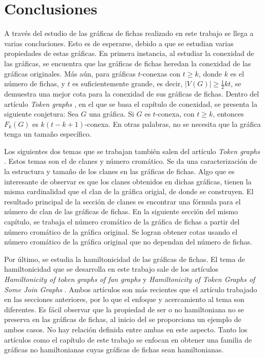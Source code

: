 \chapter{Conclusiones}
\label{sec:conclusiones}


A trav\'es del estudio de las gr\'aficas de fichas realizado en este trabajo se
llega a varias concluciones. Esto es de esperarse, debido a que se estudian
varias propiedades de estas gr\'aficas. En primera instancia, al estudiar la
conexidad de las gr\'aficas, se encuentra que las gr\'aficas de fichas heredan
la conexidad de las gr\'aficas originales. M\'as a\'un, para gr\'aficas
$t$-conexas con $t \geq k$, donde $k$ es el n\'umero de fichas, y $t$ es
suficientemente grande, es decir, $|V(G)| \geq \frac{1}{2}kt$, se demuestra una
mejor cota para la conexidad de sus gr\'aficas de fichas. Dentro del art\'iculo
\textit{Token graphs} \cite{fabilaToken}, en el que se basa el cap\'itulo de
conexidad, se presenta la siguiente conjetura: Sea $G$ una gr\'afica. Si $G$ es
$t$-conexa, con $t \geq k$, entonces $F_k(G)$ es $k(t-k+1)$-conexa. En otras
palabras, no se necesita que la gr\'afica tenga un tama\~{n}o espec\'ifico.


Los siguientes dos temas que se trabajan tambi\'en salen del art\'iculo
\textit{Token graphs} \cite{fabilaToken}. Estos temas son el de clanes y
n\'umero crom\'atico. Se da una caracterizaci\'on de la estructura y tama\~no de
los clanes en las gr\'aficas de fichas. Algo que es interesante de observar es
que los clanes obtenidos en dichas gr\'aficas, tienen la misma cardinalidad que
el clan de la gr\'afica origial, de donde se construyen. El resultado principal
de la secci\'on de clanes es encontrar una f\'ormula para el n\'umero de clan de
las gr\'aficas de fichas.   En la siguiente secci\'on del mismo cap\'itulo,  se
trabaja el n\'umero crom\'atico de la gr\'afica de fichas a partir del n\'umero
crom\'atico de la gr\'afica original. Se logran obtener cotas usando el n\'umero
crom\'atico de la gr\'afica original que no dependan del n\'umero de fichas. 

Por \'ultimo, se estudia la hamiltonicidad de las gr\'aficas de fichas. El tema
de hamiltonicidad que se desarrolla en este trabajo sale de los art\'iculos
\textit{Hamiltonicity of token graphs of fan graphs} \cite{riveraHamilt} y
\textit{Hamiltonicity of Token Graphs of Some Join Graphs} \cite{adameHamilt}.
Ambos art\'iculos son m\'as recientes que el art\'iculo trabajado en las
secciones anteriores, por lo que el enfoque y acercamiento al tema son
diferentes. Es f\'acil observar que la propiedad de ser o no hamiltoniana no se
preserva en las gr\'aficas de fichas, al inicio del  se
proporciona un ejemplo de ambos casos. No hay relaci\'on definida entre ambas en
este aspecto. Tanto los art\'iculos como el cap\'itulo de este trabajo se
enfocan en obtener una familia de gr\'aficas no hamiltonianas cuyas gr\'aficas
de fichas sean hamiltonianas. 

